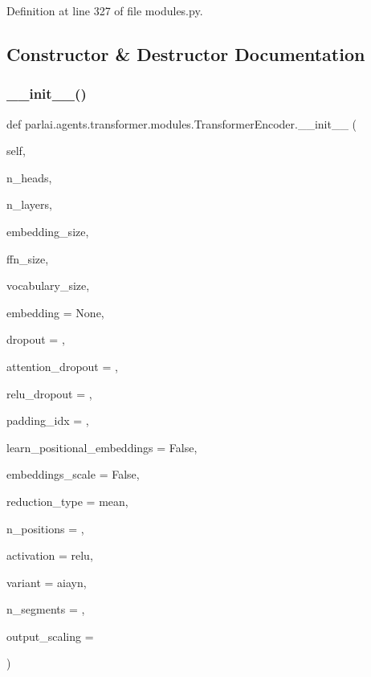 Definition at line 327 of file modules.\+py.



\subsection{Constructor \& Destructor Documentation}
\mbox{\label{classparlai_1_1agents_1_1transformer_1_1modules_1_1TransformerEncoder_a362f8b951877f3712ca59f0fb6a0ae9c}} 
\subsubsection{\texorpdfstring{\+\_\+\+\_\+init\+\_\+\+\_\+()}{\_\_init\_\_()}}
{\footnotesize\ttfamily def parlai.\+agents.\+transformer.\+modules.\+Transformer\+Encoder.\+\_\+\+\_\+init\+\_\+\+\_\+ (\begin{DoxyParamCaption}\item[{}]{self,  }\item[{}]{n\+\_\+heads,  }\item[{}]{n\+\_\+layers,  }\item[{}]{embedding\+\_\+size,  }\item[{}]{ffn\+\_\+size,  }\item[{}]{vocabulary\+\_\+size,  }\item[{}]{embedding = {\ttfamily None},  }\item[{}]{dropout = {},  }\item[{}]{attention\+\_\+dropout = {},  }\item[{}]{relu\+\_\+dropout = {},  }\item[{}]{padding\+\_\+idx = {},  }\item[{}]{learn\+\_\+positional\+\_\+embeddings = {\ttfamily False},  }\item[{}]{embeddings\+\_\+scale = {\ttfamily False},  }\item[{}]{reduction\+\_\+type = {\ttfamily \textquotesingle{}mean\textquotesingle{}},  }\item[{}]{n\+\_\+positions = {},  }\item[{}]{activation = {\ttfamily \textquotesingle{}relu\textquotesingle{}},  }\item[{}]{variant = {\ttfamily \textquotesingle{}aiayn\textquotesingle{}},  }\item[{}]{n\+\_\+segments = {},  }\item[{}]{output\+\_\+scaling = {} }\end{DoxyParamCaption})}




